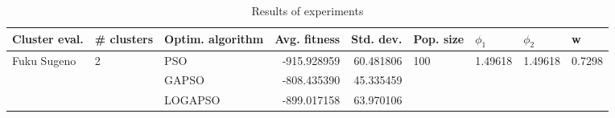 \begin{table}
\centering
\caption{Results of experiments}
\begin{tabular}{lllrrllll}
\toprule
               Cluster eval. &        \# clusters & Optim. algorithm &  Avg. fitness &  Std. dev. &            Pop. size &               $\phi_{1}$ &               $\phi_{2}$ &                       w \\
\midrule
\multirow{3}{*}{Fuku Sugeno} & \multirow{3}{*}{2} &              PSO &   -915.928959 &  60.481806 & \multirow{3}{*}{100} & \multirow{3}{*}{1.49618} & \multirow{3}{*}{1.49618} & \multirow{3}{*}{0.7298} \\
                             &                    &            GAPSO &   -808.435390 &  45.335459 &                      &                          &                          &                         \\
                             &                    &          LOGAPSO &   -899.017158 &  63.970106 &                      &                          &                          &                         \\
\bottomrule
\end{tabular}
\end{table}

